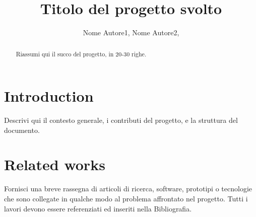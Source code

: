 \documentclass[conference]{IEEEtran}
\begin{document}
\title{Titolo del progetto svolto}

\author{
Nome Autore1,
Nome Autore2,
\\
}




\maketitle

\begin{abstract}
Riassumi qui il succo del progetto, in 20-30 righe.

\end{abstract}



\section{Introduction}
Descrivi qui il contesto generale, i contributi del progetto, e la struttura del documento.
 

\section{Related works}
Fornisci una breve rassegna di articoli di ricerca, software, prototipi o tecnologie che sono collegate in qualche modo al problema affrontato nel progetto. Tutti i lavori devono essere referenziati ed inseriti nella Bibliografia.
\end{document}
